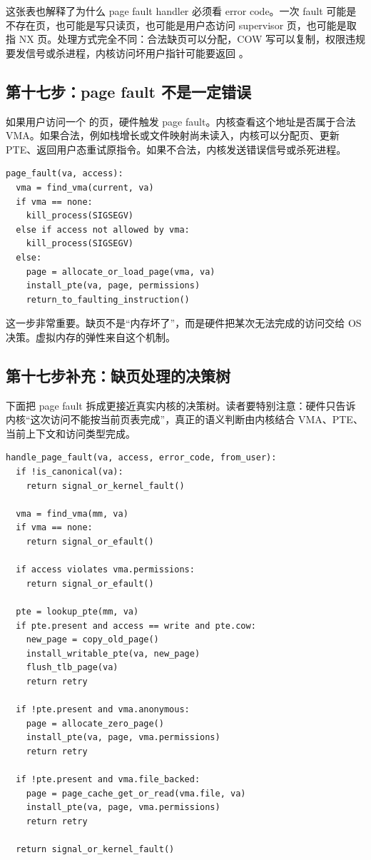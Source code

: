 这张表也解释了为什么 page fault handler 必须看 error code。一次 fault 可能是不存在页，也可能是写只读页，也可能是用户态访问 supervisor 页，也可能是取指 NX 页。处理方式完全不同：合法缺页可以分配，COW 写可以复制，权限违规要发信号或杀进程，内核访问坏用户指针可能要返回 。

\subsection{第十七步：page fault 不是一定错误}

如果用户访问一个  的页，硬件触发 page fault。内核查看这个地址是否属于合法 VMA。如果合法，例如栈增长或文件映射尚未读入，内核可以分配页、更新 PTE、返回用户态重试原指令。如果不合法，内核发送错误信号或杀死进程。

\begin{lstlisting}
page_fault(va, access):
  vma = find_vma(current, va)
  if vma == none:
    kill_process(SIGSEGV)
  else if access not allowed by vma:
    kill_process(SIGSEGV)
  else:
    page = allocate_or_load_page(vma, va)
    install_pte(va, page, permissions)
    return_to_faulting_instruction()
\end{lstlisting}

这一步非常重要。缺页不是“内存坏了”，而是硬件把某次无法完成的访问交给 OS 决策。虚拟内存的弹性来自这个机制。

\subsection{第十七步补充：缺页处理的决策树}

下面把 page fault 拆成更接近真实内核的决策树。读者要特别注意：硬件只告诉内核“这次访问不能按当前页表完成”，真正的语义判断由内核结合 VMA、PTE、当前上下文和访问类型完成。

\begin{lstlisting}
handle_page_fault(va, access, error_code, from_user):
  if !is_canonical(va):
    return signal_or_kernel_fault()

  vma = find_vma(mm, va)
  if vma == none:
    return signal_or_efault()

  if access violates vma.permissions:
    return signal_or_efault()

  pte = lookup_pte(mm, va)
  if pte.present and access == write and pte.cow:
    new_page = copy_old_page()
    install_writable_pte(va, new_page)
    flush_tlb_page(va)
    return retry

  if !pte.present and vma.anonymous:
    page = allocate_zero_page()
    install_pte(va, page, vma.permissions)
    return retry

  if !pte.present and vma.file_backed:
    page = page_cache_get_or_read(vma.file, va)
    install_pte(va, page, vma.permissions)
    return retry

  return signal_or_kernel_fault()
\end{lstlisting}


